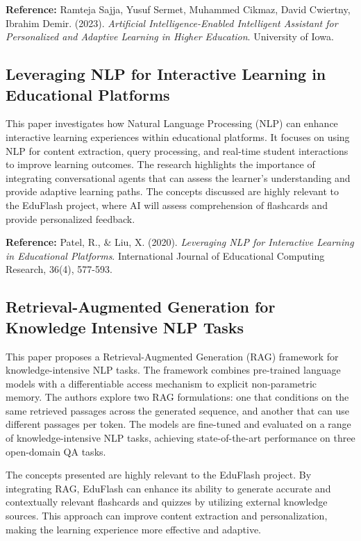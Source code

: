 \documentclass{report}
\begin{document}
\textbf{Reference:} Ramteja Sajja, Yusuf Sermet, Muhammed Cikmaz, David Cwiertny, Ibrahim Demir. (2023). \textit{Artificial Intelligence-Enabled Intelligent Assistant for Personalized and Adaptive Learning in Higher Education}. University of Iowa. \\

\subsection{Leveraging NLP for Interactive Learning in Educational Platforms}
This paper investigates how Natural Language Processing (NLP) can enhance interactive learning experiences within educational platforms. It focuses on using NLP for content extraction, query processing, and real-time student interactions to improve learning outcomes. The research highlights the importance of integrating conversational agents that can assess the learner's understanding and provide adaptive learning paths. The concepts discussed are highly relevant to the EduFlash project, where AI will assess comprehension of flashcards and provide personalized feedback.

\textbf{Reference:} Patel, R., \& Liu, X. (2020). \textit{Leveraging NLP for Interactive Learning in Educational Platforms}. International Journal of Educational Computing Research, 36(4), 577-593. \\

\subsection{Retrieval-Augmented Generation for Knowledge Intensive NLP Tasks}
This paper proposes a Retrieval-Augmented Generation (RAG) framework for knowledge-intensive NLP tasks. The framework combines pre-trained language models with a differentiable access mechanism to explicit non-parametric memory. The authors explore two RAG formulations: one that conditions on the same retrieved passages across the generated sequence, and another that can use different passages per token. The models are fine-tuned and evaluated on a range of knowledge-intensive NLP tasks, achieving state-of-the-art performance on three open-domain QA tasks.

The concepts presented are highly relevant to the EduFlash project. By integrating RAG, EduFlash can enhance its ability to generate accurate and contextually relevant flashcards and quizzes by utilizing external knowledge sources. This approach can improve content extraction and personalization, making the learning experience more effective and adaptive.
\end{document}
